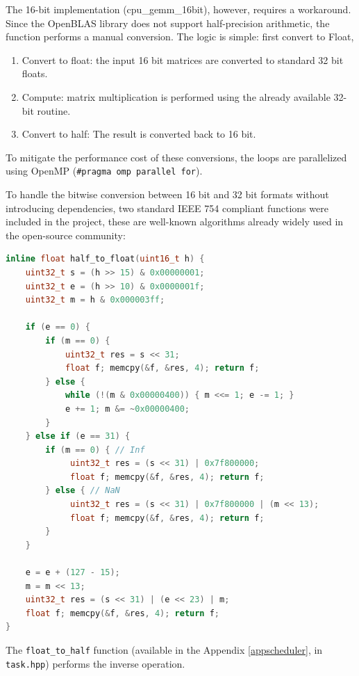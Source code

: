 The 16-bit implementation (cpu\_gemm\_16bit), however, requires a workaround. Since the OpenBLAS library does not support half-precision arithmetic, the function performs a manual conversion. The logic is simple: first convert to Float, 

\begin{enumerate}
    \item Convert to float: the input 16 bit matrices are converted to standard 32 bit floats.
    \item Compute: matrix multiplication is performed using the already available 32-bit routine.
    \item Convert to half: The result is converted back to 16 bit.
\end{enumerate}

To mitigate the performance cost of these conversions, the loops are parallelized using OpenMP (\texttt{\#pragma omp parallel for}).

To handle the bitwise conversion between 16 bit and 32 bit formats without introducing dependencies, two standard IEEE 754 compliant functions were included in the project, these are well-known algorithms already widely used in the open-source community:

\begin{lstlisting}[caption={IEEE 754 Bitwise Conversion Helpers}, language=C++] 
inline float half_to_float(uint16_t h) {
    uint32_t s = (h >> 15) & 0x00000001;
    uint32_t e = (h >> 10) & 0x0000001f;
    uint32_t m = h & 0x000003ff;
    
    if (e == 0) {
        if (m == 0) {
            uint32_t res = s << 31;
            float f; memcpy(&f, &res, 4); return f;
        } else {
            while (!(m & 0x00000400)) { m <<= 1; e -= 1; }
            e += 1; m &= ~0x00000400;
        }
    } else if (e == 31) {
        if (m == 0) { // Inf
             uint32_t res = (s << 31) | 0x7f800000;
             float f; memcpy(&f, &res, 4); return f;
        } else { // NaN
             uint32_t res = (s << 31) | 0x7f800000 | (m << 13);
             float f; memcpy(&f, &res, 4); return f;
        }
    }
    
    e = e + (127 - 15);
    m = m << 13;
    uint32_t res = (s << 31) | (e << 23) | m;
    float f; memcpy(&f, &res, 4); return f;
}
\end{lstlisting}

The \texttt{float\_to\_half} function (available in the Appendix \ref{appscheduler}, in \texttt{task.hpp}) performs the inverse operation.

